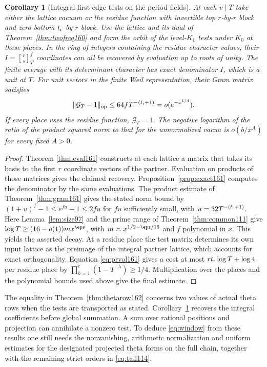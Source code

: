 \documentclass[a4paper,11pt]{article}
\newtheorem{corollary}[proposition]{Corollary}
\theoremstyle{definition}
\theoremstyle{remark}
\numberwithin{equation}{section}
\begin{document}
\begin{corollary}[Integral first-edge tests on the period fields]
\label{cor:finite162}
At each \(v\mid T\) take either the lattice vacuum or the
residue function with invertible top \(r\)-by-\(r\) block and
zero bottom \(t_{\rm r}\)-by-\(r\) block. Use the lattice and
its dual of Theorem~\ref{thm:twofreq160} and form the orbit of
the level-\(K_1\) tests under \(K_0\) at these places. In the
ring of integers containing the residue character values,
their \(I={r\brack s}_T^f\) coordinates can all be recovered
by evaluation up to roots of unity. The finite average with
its determinant character has exact denominator \(I\), which
is a unit at \(T\). For unit vectors in the finite Weil
representation, their Gram matrix satisfies
\[
      \|\mathcal G_T-1\|_{\rm op}
           \le 64fT^{-(t_{\rm r}+1)}=o(e^{-x^{1/4}}).
\]
If every place uses the residue function, \(\mathcal G_T=1\).
The negative logarithm of the ratio of the product squared
norm to that for the unnormalized vacua is \(o(b/x^A)\) for
every fixed \(A>0\).
\end{corollary}
\begin{proof}
Theorem \ref{thm:eval161} constructs at each lattice a matrix
that takes its basis to the first \(r\) coordinate vectors of
the partner. Evaluation on products of those matrices gives
the claimed recovery. Proposition~\ref{prop:exact161} computes the
denominator by the same evaluations. The product estimate of
Theorem~\ref{thm:gram161} gives the stated norm bound by
\((1+u)^f-1\le e^{fu}-1\le2fu\) for \(fu\) sufficiently
small, with \(u=32T^{-(t_{\rm r}+1)}\).
Here Lemma~\ref{lem:size97} and the prime range of
Theorem~\ref{thm:common111} give
\(\log T\ge(16-o(1))m x^\eps\), with
\(m\asymp x^{1/2-\eps/16}\) and \(f\) polynomial in \(x\).
This yields the asserted decay. At a residue place the test
matrix determines its own input lattice as the preimage of
the integral partner lattice, which accounts for exact
orthogonality. Equation \ref{eq:prvol161} gives a cost at
most \(rt_{\rm r}\log T+\log 4\) per residue place by
\(\prod_{h=1}^r(1-T^{-h})\ge1/4\). Multiplication over the
places and the polynomial bounds used above give the final
estimate.
\end{proof}

The equality in Theorem~\ref{thm:thetarow162} concerns two
values of actual theta rows when the tests are transported
as stated. Corollary~\ref{cor:finite162} recovers the integral
coefficients before global summation. A sum over rational
positions and projection can annihilate a nonzero test.
To deduce \eqref{eq:window} from these results one still needs
the nonvanishing, arithmetic normalization and uniform estimates
for the designated projected theta forms on the full chain,
together with the remaining strict orders in \eqref{eq:tail114}.
\end{document}
